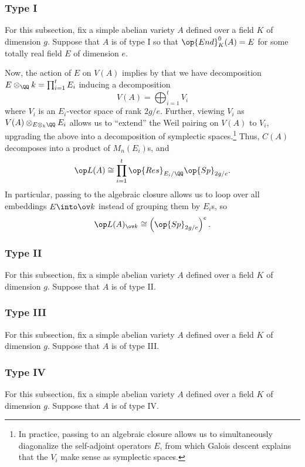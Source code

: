 \documentclass{article}
\begin{document}
\subsubsection{Type I}
For this subsection, fix a simple abelian variety $A$ defined over a field $K$ of dimension $g$. Suppose that $A$ is of type I so that $\op{End}^0_K(A)=E$ for some totally real field $E$ of dimension $e$.

Now, the action of $E$ on $V(A)$ implies by  that we have decomposition $E\otimes_\QQ k=\prod_{i=1}^tE_i$ inducing a decomposition
\[V(A)=\bigoplus_{i=1}^tV_i\]
where $V_i$ is an $E_i$-vector space of rank $2g/e$. Further, viewing $V_i$ as $V(A)\otimes_{E\otimes_k\QQ}E_i$ allows us to ``extend'' the Weil pairing on $V(A)$ to $V_i$, upgrading the above into a decomposition of symplectic spaces.\footnote{In practice, passing to an algebraic closure allows us to simultaneously diagonalize the self-adjoint operators $E$, from which Galois descent explains that the $V_i$ make sense as symplectic spaces.} Thus, $C(A)$ decomposes into a product of $M_n(E_i)$s, and
\[\op L(A)\cong\prod_{i=1}^t\op{Res}_{E_i/\QQ}\op{Sp}_{2g/e}.\]
In particular, passing to the algebraic closure allows us to loop over all embeddings $E\into\ov k$ instead of grouping them by $E_i$s, so
\[\op L(A)_{\ov k}\cong\left(\op{Sp}_{2g/e}\right)^e.\]

\subsubsection{Type II}
For this subsection, fix a simple abelian variety $A$ defined over a field $K$ of dimension $g$. Suppose that $A$ is of type II.\todo{}

\subsubsection{Type III}
For this subsection, fix a simple abelian variety $A$ defined over a field $K$ of dimension $g$. Suppose that $A$ is of type III.\todo{}

\subsubsection{Type IV}
For this subsection, fix a simple abelian variety $A$ defined over a field $K$ of dimension $g$. Suppose that $A$ is of type IV.\todo{}
\end{document}
